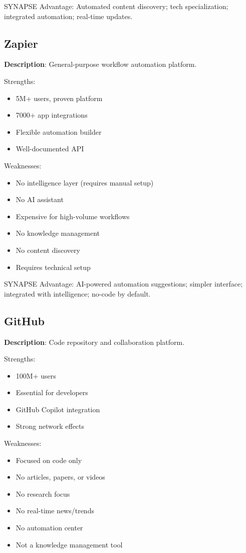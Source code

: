 \documentclass{report}
\begin{document}
SYNAPSE Advantage: Automated content discovery; tech specialization; integrated automation; real-time updates.

\subsection{Zapier}

\textbf{Description}: General-purpose workflow automation platform.

Strengths:
\begin{itemize}
    \item 5M+ users, proven platform
    \item 7000+ app integrations
    \item Flexible automation builder
    \item Well-documented API
\end{itemize}

Weaknesses:
\begin{itemize}
    \item No intelligence layer (requires manual setup)
    \item No AI assistant
    \item Expensive for high-volume workflows
    \item No knowledge management
    \item No content discovery
    \item Requires technical setup
\end{itemize}

SYNAPSE Advantage: AI-powered automation suggestions; simpler interface; integrated with intelligence; no-code by default.

\subsection{GitHub}

\textbf{Description}: Code repository and collaboration platform.

Strengths:
\begin{itemize}
    \item 100M+ users
    \item Essential for developers
    \item GitHub Copilot integration
    \item Strong network effects
\end{itemize}

Weaknesses:
\begin{itemize}
    \item Focused on code only
    \item No articles, papers, or videos
    \item No research focus
    \item No real-time news/trends
    \item No automation center
    \item Not a knowledge management tool
\end{itemize}
\end{document}
